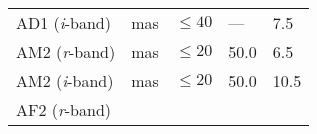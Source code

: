 \documentclass[DM,toc]{lsstdoc}
\begin{document}
\begin{longtable}[]{@{}lllll@{}}
\begin{minipage}[t]{0.19\columnwidth}
AD1 (\emph{i}-band)\strut
\end{minipage} & \begin{minipage}[t]{0.08\columnwidth}\raggedright\strut
mas\strut
\end{minipage} & \begin{minipage}[t]{0.20\columnwidth}\raggedright\strut
\(\leq 40\)\strut
\end{minipage} & \begin{minipage}[t]{0.22\columnwidth}\raggedright\strut
---\strut
\end{minipage} & \begin{minipage}[t]{0.17\columnwidth}\raggedright\strut
7.5\strut
\end{minipage}\tabularnewline
\begin{minipage}[t]{0.19\columnwidth}\raggedright\strut
AM2 (\emph{r}-band)\strut
\end{minipage} & \begin{minipage}[t]{0.08\columnwidth}\raggedright\strut
mas\strut
\end{minipage} & \begin{minipage}[t]{0.20\columnwidth}\raggedright\strut
\(\leq 20\)\strut
\end{minipage} & \begin{minipage}[t]{0.22\columnwidth}\raggedright\strut
50.0\strut
\end{minipage} & \begin{minipage}[t]{0.17\columnwidth}\raggedright\strut
6.5\strut
\end{minipage}\tabularnewline
\begin{minipage}[t]{0.19\columnwidth}\raggedright\strut
AM2 (\emph{i}-band)\strut
\end{minipage} & \begin{minipage}[t]{0.08\columnwidth}\raggedright\strut
mas\strut
\end{minipage} & \begin{minipage}[t]{0.20\columnwidth}\raggedright\strut
\(\leq 20\)\strut
\end{minipage} & \begin{minipage}[t]{0.22\columnwidth}\raggedright\strut
50.0\strut
\end{minipage} & \begin{minipage}[t]{0.17\columnwidth}\raggedright\strut
10.5\strut
\end{minipage}\tabularnewline
\begin{minipage}[t]{0.19\columnwidth}\raggedright\strut
AF2 (\emph{r}-band)\strut
\end{minipage} & \begin{minipage}[t]{0.08\columnwidth}\raggedright\strut

\end{minipage}
\end{longtable}
\end{document}

